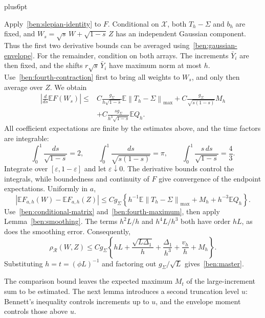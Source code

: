 \documentclass[11pt,letterpaper,twoside,leqno]{article}
\makeatletter
\theoremstyle{bookplain}
\theoremstyle{bookremark}
\renewenvironment{proof}[1][\proofname]{\par
  \pushQED{\qed}\normalfont\topsep6pt plus6pt\relax
  \trivlist\item[\hskip\labelsep\bfseries #1\@addpunct{.}]\ignorespaces
}{\popQED\endtrivlist\@endpefalse}
\newcommand{\E}{\mathbb E}
\newcommand{\norm}[1]{\left\lVert#1\right\rVert}
\newcommand{\rh}{\rho_{\mathcal R}}
\makeatother
\begin{document}
\begin{proof}[Proof of Lemma~\ref{ben:comparison}]
Apply~\eqref{ben:slepian-identity} to $F$. Conditional on
$\mathcal X$, both $T_h-\Sigma$ and $b_h$ are fixed, and
$W_s=\sqrt s\,W+\sqrt{1-s}\,Z$ has an independent Gaussian
component. Thus the first two derivative bounds can be averaged
using~\eqref{ben:gaussian-envelope}. For the remainder, condition
on both arrays. The increments $\bar Y_i$ are then fixed, and
the shifts $r\sqrt s\,\bar Y_i$ have maximum norm at most $h$.
Use~\eqref{ben:fourth-contraction} first to bring all weights to
$W_s$, and only then average over $Z$. We obtain
\begin{align*}
 \left|\frac d{ds}\E F(W_s)\right|
 \le{}&C\frac{g_\Sigma}{h\sqrt{1-s}}
                \E\norm{T_h-\Sigma}_{\max}
       +C\frac{g_\Sigma}{\sqrt{s(1-s)}}M_h\\
 &+C\frac{sg_\Sigma}{h^3\sqrt{1-s}}\E Q_h.
\end{align*}
All coefficient expectations are finite by the estimates above,
and the time factors are integrable:
\[
 \int_0^1\frac{ds}{\sqrt{1-s}}=2,\qquad
 \int_0^1\frac{ds}{\sqrt{s(1-s)}}=\pi,\qquad
 \int_0^1\frac{s\,ds}{\sqrt{1-s}}=\frac43.
\]
Integrate over $[\varepsilon,1-\varepsilon]$ and let
$\varepsilon\downarrow0$. The derivative bounds control the
integrals, while boundedness and continuity of $F$ give convergence
of the endpoint expectations. Uniformly in $a$,
\[
 |\E F_{a,h}(W)-\E F_{a,h}(Z)|
 \le Cg_\Sigma\left\{
 h^{-1}\E\norm{T_h-\Sigma}_{\max}+M_h+h^{-3}\E Q_h\right\}.
\]
Use~\eqref{ben:conditional-matrix} and~\eqref{ben:fourth-maximum},
then apply Lemma~\ref{ben:smoothing}. The terms $h^2L/h$ and
$h^4L/h^3$ both have order $hL$, as does the smoothing error.
Consequently,
\[
 \rh(W,Z)\le Cg_\Sigma\left\{
 hL+\frac{\sqrt{L\Delta_1}}h
 +\frac{\Delta_1}{h^3}+\frac{v_h}h+M_h\right\}.
\]
Substituting $h=t=(\phi L)^{-1}$ and factoring out
$g_\Sigma/\sqrt L$ gives~\eqref{ben:master}.
\end{proof}

The comparison bound leaves the expected maximum $M_t$ of the
large-increment sum to be estimated. The next lemma introduces
a second truncation level $u$: Bennett's inequality controls
increments up to $u$, and the envelope moment controls those
above $u$.
\end{document}
